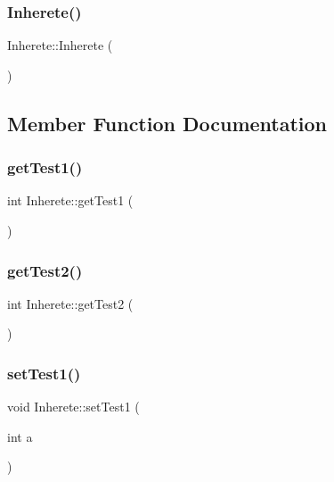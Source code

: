\subsubsection{\texorpdfstring{Inherete()}{Inherete()}}
{\footnotesize\ttfamily Inherete\+::\+Inherete (\begin{DoxyParamCaption}{ }\end{DoxyParamCaption})}



\subsection{Member Function Documentation}
\hypertarget{class_inherete_ab68de696572168fd0e000769925c578f}{}\label{class_inherete_ab68de696572168fd0e000769925c578f} 
\subsubsection{\texorpdfstring{get\+Test1()}{getTest1()}}
{\footnotesize\ttfamily int Inherete\+::get\+Test1 (\begin{DoxyParamCaption}{ }\end{DoxyParamCaption})}

\hypertarget{class_inherete_a351b5ccefdd1f0dbe1bfcac0a7f98270}{}\label{class_inherete_a351b5ccefdd1f0dbe1bfcac0a7f98270} 
\subsubsection{\texorpdfstring{get\+Test2()}{getTest2()}}
{\footnotesize\ttfamily int Inherete\+::get\+Test2 (\begin{DoxyParamCaption}{ }\end{DoxyParamCaption})}

\hypertarget{class_inherete_a0952f09588eed23f2c9ff449d6cb1166}{}\label{class_inherete_a0952f09588eed23f2c9ff449d6cb1166} 
\subsubsection{\texorpdfstring{set\+Test1()}{setTest1()}}
{\footnotesize\ttfamily void Inherete\+::set\+Test1 (\begin{DoxyParamCaption}\item[{int}]{a }\end{DoxyParamCaption})}

